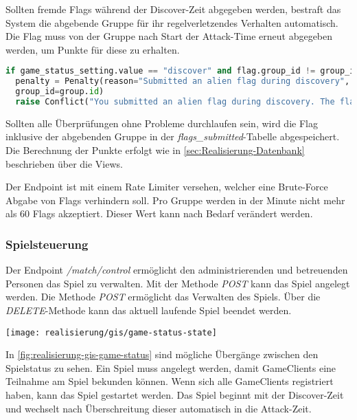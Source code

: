 Sollten fremde Flags während der Discover-Zeit abgegeben werden, bestraft das System die abgebende Gruppe für ihr regelverletzendes Verhalten automatisch. Die Flag muss von der Gruppe nach Start der Attack-Time erneut abgegeben werden, um Punkte für diese zu erhalten.

\begin{lstlisting}[language=Python, frame=single, caption={GIS Strafe für abgeben fremder Flags}, captionpos=b, label={lst:gis-delete-all-players}]
if game_status_setting.value == "discover" and flag.group_id != group_id:
  penalty = Penalty(reason="Submitted an alien flag during discovery", points=penalty_points,
  group_id=group.id)
  raise Conflict("You submitted an alien flag during discovery. The flag is not accepted. You'll be punished.")
\end{lstlisting}

Sollten alle Überprüfungen ohne Probleme durchlaufen sein, wird die Flag inklusive der abgebenden Gruppe in der \textit{flags\_submitted}-Tabelle abgespeichert. Die Berechnung der Punkte erfolgt wie in \autoref{sec:Realisierung-Datenbank} beschrieben über die Views.

Der Endpoint ist mit einem Rate Limiter versehen, welcher eine Brute-Force Abgabe von Flags verhindern soll. Pro Gruppe werden in der Minute nicht mehr als 60 Flags akzeptiert. Dieser Wert kann nach Bedarf verändert werden.

\subsubsection{Spielsteuerung}
Der Endpoint \textit{/match/control} ermöglicht den administrierenden und betreuenden Personen das Spiel zu verwalten. Mit der Methode \textit{POST} kann das Spiel angelegt werden. Die Methode \textit{POST} ermöglicht das Verwalten des Spiels. Über die \textit{DELETE}-Methode kann das aktuell laufende Spiel beendet werden.

\begin{center}
	\texttt{[image: realisierung/gis/game-status-state]}
	\label{fig:realisierung-gis-game-status}
\end{center}

In \autoref{fig:realisierung-gis-game-status} sind mögliche Übergänge zwischen den Spielstatus zu sehen. Ein Spiel muss angelegt werden, damit GameClients eine Teilnahme am Spiel bekunden können. Wenn sich alle GameClients registriert haben, kann das Spiel gestartet werden. Das Spiel beginnt mit der Discover-Zeit und wechselt nach Überschreitung dieser automatisch in die Attack-Zeit.

